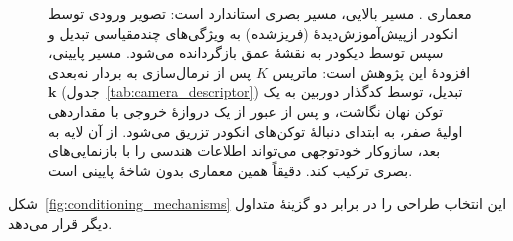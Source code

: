 \begin{figure}[htbp]
{%
    }
    \caption[معماری مدل پیشنهادی و مسیر تزریق ماتریس مشخصهٔ دوربین]{معماری
    \proposedmodel{}. مسیر بالایی، مسیر بصری استاندارد \basemodel{} است:
    تصویر ورودی توسط انکودر ازپیش‌آموزش‌دیدهٔ  (فریزشده) به
    ویژگی‌های چندمقیاسی تبدیل و سپس توسط دیکودر  به نقشهٔ عمق
    بازگردانده می‌شود. مسیر پایینی، افزودهٔ این پژوهش است: ماتریس $K$ پس از
    نرمال‌سازی به بردار نه‌بعدی $\mathbf{k}$ (جدول~\ref{tab:camera_descriptor})
    تبدیل، توسط کدگذار دوربین به یک توکن نهان نگاشت، و پس از عبور از یک
    دروازهٔ خروجی با مقداردهی اولیهٔ صفر، به ابتدای دنبالهٔ توکن‌های انکودر
    تزریق می‌شود. از آن لایه به بعد، سازوکار خودتوجهی می‌تواند اطلاعات هندسی
    را با بازنمایی‌های بصری ترکیب کند. \controlmodel{} دقیقاً همین معماری
    بدون شاخهٔ پایینی است.}
    \label{fig:proposed_architecture}
\end{figure}

شکل~\ref{fig:conditioning_mechanisms} این انتخاب طراحی را در برابر دو
گزینهٔ متداول دیگر قرار می‌دهد.

